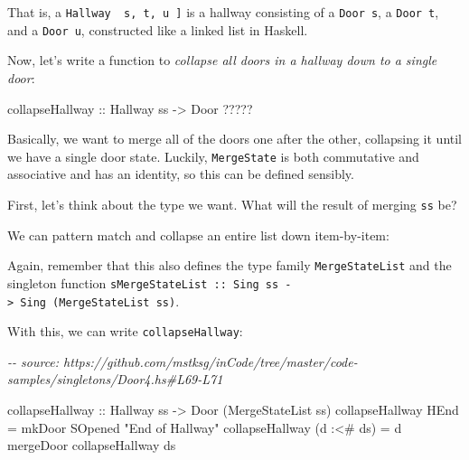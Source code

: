 \documentclass[]{article}
\newenvironment{Shaded}{}{}
\newcommand{\CommentTok}[1]{\textcolor[rgb]{0.38,0.63,0.69}{\textit{#1}}}
\newcommand{\DataTypeTok}[1]{\textcolor[rgb]{0.56,0.13,0.00}{#1}}
\newcommand{\NormalTok}[1]{#1}
\newcommand{\OperatorTok}[1]{\textcolor[rgb]{0.40,0.40,0.40}{#1}}
\newcommand{\OtherTok}[1]{\textcolor[rgb]{0.00,0.44,0.13}{#1}}
\newcommand{\StringTok}[1]{\textcolor[rgb]{0.25,0.44,0.63}{#1}}
\begin{document}
That is, a \texttt{Hallway\ \textquotesingle{}{[}\ s,\ t,\ u\ {]}} is a hallway
consisting of a \texttt{Door\ s}, a \texttt{Door\ t}, and a \texttt{Door\ u},
constructed like a linked list in Haskell.

Now, let's write a function to \emph{collapse all doors in a hallway down to a
single door}:

\begin{Shaded}
\begin{Highlighting}[]
\OtherTok{collapseHallway ::} \DataTypeTok{Hallway}\NormalTok{ ss }\OtherTok{{-}>} \DataTypeTok{Door} \OperatorTok{?????}
\end{Highlighting}
\end{Shaded}

Basically, we want to merge all of the doors one after the other, collapsing it
until we have a single door state. Luckily, \texttt{MergeState} is both
commutative and associative and has an identity, so this can be defined
sensibly.

First, let's think about the type we want. What will the result of merging
\texttt{ss} be?

We can pattern match and collapse an entire list down item-by-item:

\begin{Shaded}
\end{Shaded}

Again, remember that this also defines the type family \texttt{MergeStateList}
and the singleton function
\texttt{sMergeStateList\ ::\ Sing\ ss\ -\textgreater{}\ Sing\ (MergeStateList\ ss)}.

With this, we can write \texttt{collapseHallway}:

\begin{Shaded}
\begin{Highlighting}[]
\CommentTok{{-}{-} source: https://github.com/mstksg/inCode/tree/master/code{-}samples/singletons/Door4.hs\#L69{-}L71}

\OtherTok{collapseHallway ::} \DataTypeTok{Hallway}\NormalTok{ ss }\OtherTok{{-}>} \DataTypeTok{Door}\NormalTok{ (}\DataTypeTok{MergeStateList}\NormalTok{ ss)}
\NormalTok{collapseHallway }\DataTypeTok{HEnd}       \OtherTok{=}\NormalTok{ mkDoor }\DataTypeTok{SOpened} \StringTok{"End of Hallway"}
\NormalTok{collapseHallway (d }\OperatorTok{:<\#}\NormalTok{ ds) }\OtherTok{=}\NormalTok{ d }\OtherTok{\textasciigrave{}mergeDoor\textasciigrave{}}\NormalTok{ collapseHallway ds}
\end{Highlighting}
\end{Shaded}
\end{document}
